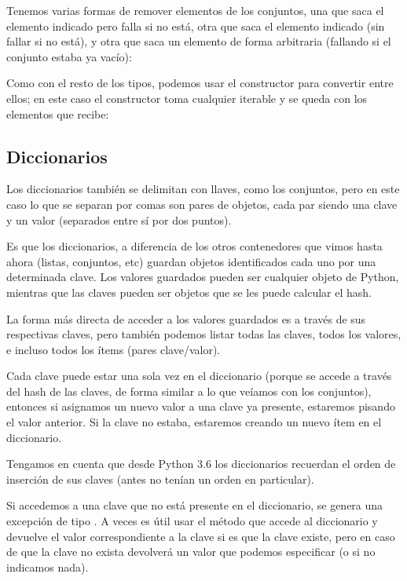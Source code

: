 Tenemos varias formas de remover elementos de los conjuntos, una que saca el elemento indicado pero falla si no está, otra que saca el elemento indicado (sin fallar si no está), y otra que saca un elemento de forma arbitraria (fallando si el conjunto estaba ya vacío):


Como con el resto de los tipos, podemos usar el constructor para convertir entre ellos; en este caso el constructor toma cualquier iterable y se queda con los elementos que recibe:



\subsection{Diccionarios}

Los diccionarios también se delimitan con llaves, como los conjuntos, pero en este caso lo que se separan por comas son pares de objetos, cada par siendo una clave y un valor (separados entre sí por dos puntos).

Es que los diccionarios, a diferencia de los otros contenedores que vimos hasta ahora (listas, conjuntos, etc) guardan objetos identificados cada uno por una determinada clave. Los valores guardados pueden ser cualquier objeto de Python, mientras que las claves pueden ser objetos que se les puede calcular el hash.

La forma más directa de acceder a los valores guardados es a través de sus respectivas claves, pero también podemos listar todas las claves, todos los valores, e incluso todos los ítems (pares clave/valor).


Cada clave puede estar una sola vez en el diccionario (porque se accede a través del hash de las claves, de forma similar a lo que veíamos con los conjuntos), entonces si asignamos un nuevo valor a una clave ya presente, estaremos pisando el valor anterior. Si la clave no estaba, estaremos creando un nuevo ítem en el diccionario.


Tengamos en cuenta que desde Python 3.6 los diccionarios recuerdan el orden de inserción de sus claves (antes no tenían un orden en particular).

Si accedemos a una clave que no está presente en el diccionario, se genera una excepción de tipo . A veces es útil usar el método  que accede al diccionario y devuelve el valor correspondiente a la clave si es que la clave existe, pero en caso de que la clave no exista devolverá un valor que podemos especificar (o  si no indicamos nada).

